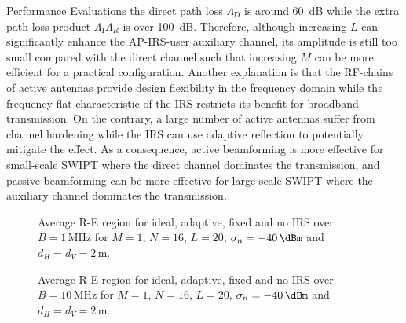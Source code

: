 \documentclass[journal]{IEEEtran}
\begin{document}
\begin{section}{Performance Evaluations}
the direct path loss $\Lambda_\text{D}$ is around \SI{60}{\dB} while the extra path loss product $\Lambda_{\text{I}}\Lambda_R$ is over \SI{100}{\dB}. Therefore, although increasing $L$ can significantly enhance the AP-IRS-user auxiliary channel, its amplitude is still too small compared with the direct channel such that increasing $M$ can be more efficient for a practical configuration. Another explanation is that the RF-chains of active antennas provide design flexibility in the frequency domain while the frequency-flat characteristic of the IRS restricts its benefit for broadband transmission. On the contrary, a large number of active antennas suffer from channel hardening while the IRS can use adaptive reflection to potentially mitigate the effect. As a consequence, active beamforming is more effective for small-scale SWIPT where the direct channel dominates the transmission, and passive beamforming can be more effective for large-scale SWIPT where the auxiliary channel dominates the transmission.

		\begin{figure}[!t]
			\centering
			\begin{adjustbox}{width=\linewidth}
				
			\end{adjustbox}
			\caption{Average R-E region for ideal, adaptive, fixed and no IRS over $B=1\,\si{\MHz}$ for $M=1$, $N=16$, $L=20$, $\sigma_n=-40\,\si{\dBm}$ and $d_H=d_V=2\,\si{\meter}$.}
			\label{fi:re_irs_1mhz}
		\end{figure}

		\begin{figure}[!t]
			\centering
			\begin{adjustbox}{width=\linewidth}
				
			\end{adjustbox}
			\caption{Average R-E region for ideal, adaptive, fixed and no IRS over $B=10\,\si{\MHz}$ for $M=1$, $N=16$, $L=20$, $\sigma_n=-40\,\si{\dBm}$ and $d_H=d_V=2\,\si{\meter}$.}
			\label{fi:re_irs_10mhz}
		\end{figure}


\end{section}
\end{document}
